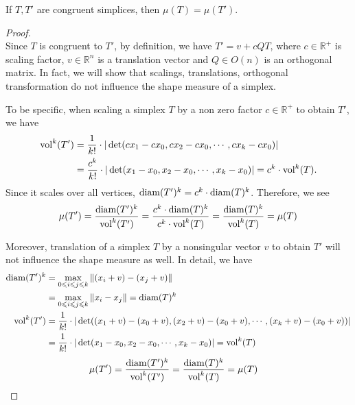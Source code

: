     \begin{lemma*}
    If $T, T'$ are congruent simplices, then $\mu(T) = \mu(T')$.
    \end{lemma*}
    \begin{proof}\mbox{}\\
    Since $T$ is congruent to $T'$, by definition, we have $T' = v + cQT$, where $c\in\mathbb{R}^{+}$ is scaling factor, $v\in\mathbb{R}^n$ is a translation vector and $Q\in O(n)$ is an orthogonal matrix. In fact, we will show that scalings, translations, orthogonal transformation do not influence the shape measure of a simplex. 
    
    To be specific, when scaling a simplex $T$ by a non zero factor $c\in\mathbb{R}^{+}$ to obtain $T'$, we have 
    \begin{align*}
     \operatorname{vol}^k(T') &= \frac{1}{k!}\cdot|\det(cx_1-cx_0, cx_2-cx_0,\cdots, cx_k-cx_0)| \\
               &= \frac{c^k}{k!}\cdot|\det(x_1-x_0, x_2-x_0,\cdots, x_k-x_0)| = c^k\cdot \operatorname{vol}^k(T).
    \end{align*}
    Since it scales over all vertices, $\operatorname{diam}(T')^k = c^k\cdot \operatorname{diam}(T)^k$. Therefore, we see
    \begin{align*}
    \mu(T') = \frac{\operatorname{diam}(T')^k}{\operatorname{vol}^k(T')} = \frac{c^k\cdot \operatorname{diam}(T)^k}{c^k\cdot \operatorname{vol}^k(T)} = \frac{\operatorname{diam}(T)^k}{\operatorname{vol}^k(T)} = \mu(T)
    \end{align*}

    Moreover, translation of a simplex $T$ by a nonsingular vector $v$ to obtain $T'$ will not influence the shape measure as well. In detail, we have
    \begin{align*}
    \operatorname{diam}(T')^k &= \max_{0\leqslant i\leqslant j\leqslant k} \|(x_i + v) - (x_j + v)\|\\ 
               &= \max_{0\leqslant i\leqslant j\leqslant k}\|x_i - x_j\| = \operatorname{diam}(T)^k \\
    \operatorname{vol}^k(T') &= \frac{1}{k!}\cdot|\det((x_1+v) - (x_0+v), (x_2+v)-(x_0+v),\cdots,(x_k+v)-(x_0+v))|\\
              &= \frac{1}{k!}\cdot|\det(x_1-x_0, x_2-x_0,\cdots, x_k-x_0)| = \operatorname{vol}^k(T)
    \end{align*}
    \begin{align*}
    \mu(T') &= \frac{\operatorname{diam}(T')^k}{\operatorname{vol}^k(T')} = \frac{\operatorname{diam}(T)^k}{\operatorname{vol}^k(T)} = \mu(T)
    \end{align*}


\end{proof}
